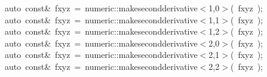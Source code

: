 \documentclass[9pt,onside]{article}
\newcommand{\hlstd}[1]{\textcolor[rgb]{0.2,0,0.4}{#1}}
\newcommand{\hlnum}[1]{\textcolor[rgb]{0.2,0.73,0.02}{#1}}
\newcommand{\hlopt}[1]{\textcolor[rgb]{0.33,0.33,0.33}{#1}}
\newcommand{\hlkwb}[1]{\textcolor[rgb]{0.96,0.55,0.14}{#1}}
\newcommand{\hlkwc}[1]{\textcolor[rgb]{0,0,1}{#1}}
\begin{document}
{\hlstd{}\hlstd{\ \ \ \ }\hlstd{}\hlkwc{auto\ }\hlstd{}\hlkwb{const}\hlstd{}\hlopt{\&\ }\hlstd{fxyz\ }\hlopt{=\ }\hlstd{numeric}\hlopt{::}\hlstd{make\textunderscore second\textunderscore derivative}\hlopt{$<$}\hlstd{}\hlnum{1}\hlstd{}\hlopt{,}\hlstd{}\hlnum{0}\hlstd{}\hlopt{$>$(\ }\hlstd{fxyz\ }\hlopt{);}\hspace*{\fill}\\
\hlstd{}\hlstd{\ \ \ \ }\hlstd{}\hlkwc{auto\ }\hlstd{}\hlkwb{const}\hlstd{}\hlopt{\&\ }\hlstd{fxyz\ }\hlopt{=\ }\hlstd{numeric}\hlopt{::}\hlstd{make\textunderscore second\textunderscore derivative}\hlopt{$<$}\hlstd{}\hlnum{1}\hlstd{}\hlopt{,}\hlstd{}\hlnum{1}\hlstd{}\hlopt{$>$(\ }\hlstd{fxyz\ }\hlopt{);}\hspace*{\fill}\\
\hlstd{}\hlstd{\ \ \ \ }\hlstd{}\hlkwc{auto\ }\hlstd{}\hlkwb{const}\hlstd{}\hlopt{\&\ }\hlstd{fxyz\ }\hlopt{=\ }\hlstd{numeric}\hlopt{::}\hlstd{make\textunderscore second\textunderscore derivative}\hlopt{$<$}\hlstd{}\hlnum{1}\hlstd{}\hlopt{,}\hlstd{}\hlnum{2}\hlstd{}\hlopt{$>$(\ }\hlstd{fxyz\ }\hlopt{);}\hspace*{\fill}\\
\hlstd{}\hlstd{\ \ \ \ }\hlstd{}\hlkwc{auto\ }\hlstd{}\hlkwb{const}\hlstd{}\hlopt{\&\ }\hlstd{fxyz\ }\hlopt{=\ }\hlstd{numeric}\hlopt{::}\hlstd{make\textunderscore second\textunderscore derivative}\hlopt{$<$}\hlstd{}\hlnum{2}\hlstd{}\hlopt{,}\hlstd{}\hlnum{0}\hlstd{}\hlopt{$>$(\ }\hlstd{fxyz\ }\hlopt{);}\hspace*{\fill}\\
\hlstd{}\hlstd{\ \ \ \ }\hlstd{}\hlkwc{auto\ }\hlstd{}\hlkwb{const}\hlstd{}\hlopt{\&\ }\hlstd{fxyz\ }\hlopt{=\ }\hlstd{numeric}\hlopt{::}\hlstd{make\textunderscore second\textunderscore derivative}\hlopt{$<$}\hlstd{}\hlnum{2}\hlstd{}\hlopt{,}\hlstd{}\hlnum{1}\hlstd{}\hlopt{$>$(\ }\hlstd{fxyz\ }\hlopt{);}\hspace*{\fill}\\
\hlstd{}\hlstd{\ \ \ \ }\hlstd{}\hlkwc{auto\ }\hlstd{}\hlkwb{const}\hlstd{}\hlopt{\&\ }\hlstd{fxyz\ }\hlopt{=\ }\hlstd{numeric}\hlopt{::}\hlstd{make\textunderscore second\textunderscore derivative}\hlopt{$<$}\hlstd{}\hlnum{2}\hlstd{}\hlopt{,}\hlstd{}\hlnum{2}\hlstd{}\hlopt{$>$(\ }\hlstd{fxyz\ }\hlopt{);}\hspace*{\fill}\\
\hlstd{\hspace*{\fill}\\
}}
\end{document}
